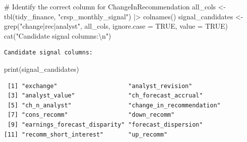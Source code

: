 \documentclass[
  letterpaper,
  DIV=11,
  numbers=noendperiod]{scrartcl}
\newenvironment{Shaded}{\begin{snugshade}}{\end{snugshade}}
\newcommand{\AttributeTok}[1]{\textcolor[rgb]{0.40,0.45,0.13}{#1}}
\newcommand{\CommentTok}[1]{\textcolor[rgb]{0.37,0.37,0.37}{#1}}
\newcommand{\ConstantTok}[1]{\textcolor[rgb]{0.56,0.35,0.01}{#1}}
\newcommand{\FunctionTok}[1]{\textcolor[rgb]{0.28,0.35,0.67}{#1}}
\newcommand{\NormalTok}[1]{\textcolor[rgb]{0.00,0.23,0.31}{#1}}
\newcommand{\OtherTok}[1]{\textcolor[rgb]{0.00,0.23,0.31}{#1}}
\newcommand{\SpecialCharTok}[1]{\textcolor[rgb]{0.37,0.37,0.37}{#1}}
\newcommand{\StringTok}[1]{\textcolor[rgb]{0.13,0.47,0.30}{#1}}
\begin{document}
\begin{Shaded}
\begin{Highlighting}[]
\CommentTok{\# Identify the correct column for ChangeInRecommendation}
\NormalTok{all\_cols }\OtherTok{\textless{}{-}} \FunctionTok{tbl}\NormalTok{(tidy\_finance, }\StringTok{"crsp\_monthly\_signal"}\NormalTok{) }\SpecialCharTok{|\textgreater{}} \FunctionTok{colnames}\NormalTok{()}
\NormalTok{signal\_candidates }\OtherTok{\textless{}{-}} \FunctionTok{grep}\NormalTok{(}\StringTok{"change|rec|analyst"}\NormalTok{, all\_cols, }\AttributeTok{ignore.case =} \ConstantTok{TRUE}\NormalTok{, }\AttributeTok{value =} \ConstantTok{TRUE}\NormalTok{)}
\FunctionTok{cat}\NormalTok{(}\StringTok{"Candidate signal columns:}\SpecialCharTok{\textbackslash{}n}\StringTok{"}\NormalTok{)}
\end{Highlighting}
\end{Shaded}

\begin{verbatim}
Candidate signal columns:
\end{verbatim}

\begin{Shaded}
\begin{Highlighting}[]
\FunctionTok{print}\NormalTok{(signal\_candidates)}
\end{Highlighting}
\end{Shaded}

\begin{verbatim}
 [1] "exchange"                    "analyst_revision"           
 [3] "analyst_value"               "ch_forecast_accrual"        
 [5] "ch_n_analyst"                "change_in_recommendation"   
 [7] "cons_recomm"                 "down_recomm"                
 [9] "earnings_forecast_disparity" "forecast_dispersion"        
[11] "recomm_short_interest"       "up_recomm"                  
\end{verbatim}
\end{document}
